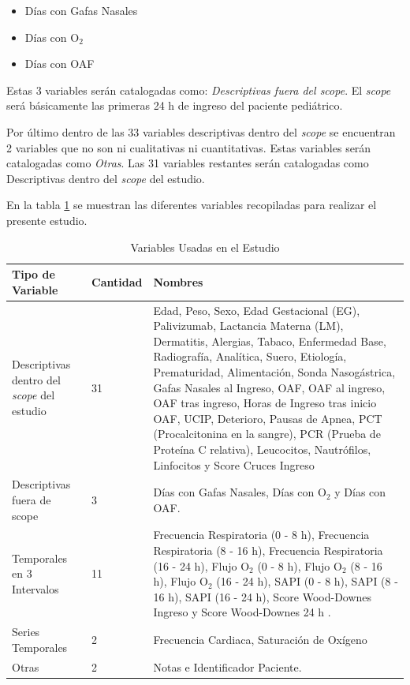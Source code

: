 \begin{itemize}
    \item Días con Gafas Nasales
    \item Días con O$_2$
    \item Días con OAF
\end{itemize}

Estas 3 variables serán catalogadas como: \textit{Descriptivas fuera del scope}. El \textit{scope} será básicamente las primeras 24 h de ingreso del paciente pediátrico.

Por último dentro de las 33 variables descriptivas dentro del \textit{scope} se encuentran 2 variables que no son ni cualitativas ni cuantitativas. Estas variables serán catalogadas como \textit{Otras}. Las 31 variables restantes serán catalogadas como Descriptivas dentro del \textit{scope} del estudio.

En la tabla \ref{tabla:variables_estudio} se muestran las diferentes variables recopiladas para realizar el presente estudio. 

\begin{table}[H]
    \centering
        \begin{tabular}{| m{5cm} | m{1.75cm} | m{7cm} |}
            \hline Tipo de Variable & Cantidad & Nombres  \\ \hline
            Descriptivas dentro del \textit{scope} del estudio & 31 & Edad, Peso, Sexo, Edad Gestacional (EG), Palivizumab, Lactancia Materna (LM), Dermatitis, Alergias, Tabaco, Enfermedad Base, Radiografía, Analítica, Suero, Etiología, Prematuridad, Alimentación, Sonda Nasogástrica, Gafas Nasales al Ingreso, OAF, OAF al ingreso, OAF tras ingreso, Horas de Ingreso tras inicio OAF, UCIP, Deterioro, Pausas de Apnea, PCT (Procalcitonina en la sangre), PCR (Prueba de Proteína C relativa), Leucocitos, Nautrófilos, Linfocitos y Score Cruces Ingreso  \\ \hline
            Descriptivas fuera de scope & 3 & Días con Gafas Nasales, Días con O$_2$ y Días con OAF. \\ \hline
            Temporales en 3 Intervalos & 11 & Frecuencia Respiratoria (0 - 8 h), Frecuencia Respiratoria (8 - 16 h),
            Frecuencia Respiratoria (16 - 24 h),
            Flujo O$_2$ (0 - 8 h),
            Flujo O$_2$ (8 - 16 h),
            Flujo O$_2$ (16 - 24 h),
            SAPI (0 - 8 h),
            SAPI (8 - 16 h), 
            SAPI (16 - 24 h), Score Wood-Downes Ingreso y Score Wood-Downes 24 h . \\ \hline
            Series Temporales & 2 & Frecuencia Cardiaca, Saturación de Oxígeno \\ \hline
            Otras & 2 & Notas e Identificador Paciente. \\ \hline
        \end{tabular}
    \caption{Variables Usadas en el Estudio}\label{tabla:variables_estudio}
\end{table}

